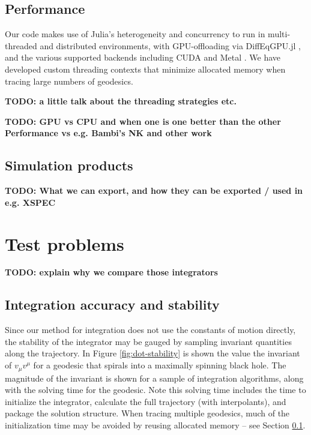 \documentclass[fleqn,usenatbib]{mnras}
\newcommand{\todo}[1]{{\noindent \bf \color{red} TODO: #1}}
\begin{document}
\subsection{Performance}
\label{sec:performance}

Our code makes use of Julia's heterogeneity and concurrency to run in multi-threaded and distributed environments, with GPU-offloading via DiffEqGPU.jl \citep{utkarsh2023automated}, and the various supported backends including CUDA and Metal \citep{besard2018juliagpu}. We have developed custom threading contexts that minimize allocated memory when tracing large numbers of geodesics.


\todo{a little talk about the threading strategies etc.}

\todo{GPU vs CPU and when one is one better than the other
Performance vs e.g. Bambi's NK and other work}

\subsection{Simulation products}

\todo{What we can export, and how they can be exported / used in e.g. XSPEC}

\section{Test problems}

\todo{explain why we compare those integrators}

\subsection{Integration accuracy and stability}

Since our method for integration does not use the constants of motion directly, the stability of the integrator may be gauged by sampling invariant quantities along the trajectory. In Figure \ref{fig:dot-stability} is shown the value the invariant of $v_\mu v^\mu$ for a geodesic that spirals into a maximally spinning black hole. The magnitude of the invariant is shown for a sample of integration algorithms, along with the solving time for the geodesic. Note this solving time includes the time to initialize the integrator, calculate the full trajectory (with interpolants), and package the solution structure. When tracing multiple geodesics, much of the initialization time may be avoided by reusing allocated memory -- see Section \ref{sec:performance}.
\end{document}
